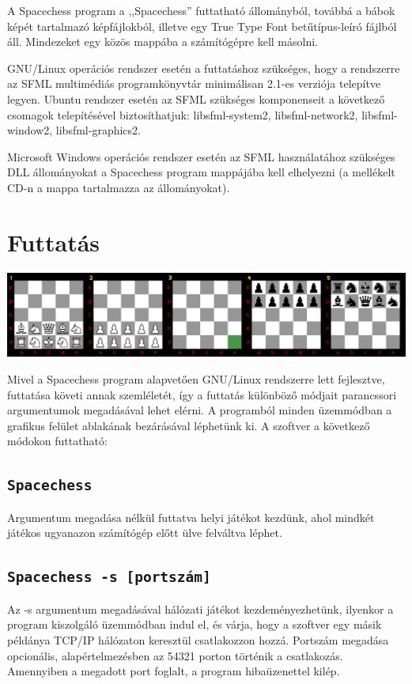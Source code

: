 \documentclass[12pt, twoside]{report}
\begin{document}
A Spacechess program a ,,Spacechess'' futtatható állományból, továbbá a bábok képét tartalmazó képfájlokból, illetve egy True Type Font betűtípus-leíró fájlból áll. Mindezeket egy közös mappába a számítógépre kell másolni. 

GNU/Linux operációs rendszer esetén a futtatáshoz szükséges, hogy a rendszerre az SFML multimédiás programkönyvtár minimálisan 2.1-es verziója telepítve legyen. Ubuntu rendszer esetén az SFML szükséges komponenseit a következő csomagok telepítésével biztosíthatjuk: libsfml-system2, libsfml-network2, libsfml-window2, libsfml-graphics2.

Microsoft Windows operációs rendszer esetén az SFML használatához szükséges DLL állományokat a Spacechess program mappájába kell elhelyezni (a mellékelt CD-n a mappa tartalmazza az állományokat). 

\section{Futtatás}	

\includegraphics[width=\textwidth]{SCScreenshotLin4}

Mivel a Spacechess program alapvetően GNU/Linux rendszerre lett fejlesztve, futtatása követi annak szemléletét, így a futtatás különböző módjait parancssori argumentumok megadásával lehet elérni. A programból minden üzemmódban a grafikus felület ablakának bezárásával léphetünk ki. A szoftver a következő módokon futtatható:
\subsection*{\tt Spacechess}
Argumentum megadása nélkül futtatva helyi játékot kezdünk, ahol mindkét játékos ugyanazon számítógép előtt ülve felváltva léphet.
\subsection*{\tt Spacechess -s [portszám]}
Az -s argumentum megadásával hálózati játékot kezdeményezhetünk, ilyenkor a program kiszolgáló üzemmódban indul el, és várja, hogy a szoftver egy másik példánya TCP/IP hálózaton keresztül csatlakozzon hozzá. Portszám megadása opcionális, a\-lap\-ér\-tel\-me\-zés\-ben az 54321 porton történik a csatlakozás. Amennyiben a megadott port foglalt, a program hibaüzenettel kilép.
\end{document}
